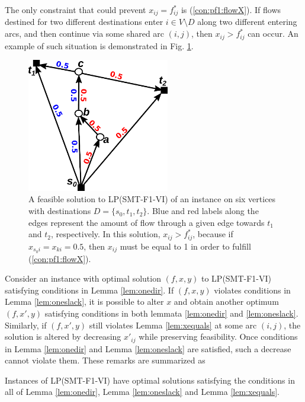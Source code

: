 The only constraint that could prevent $x_{ij}=f^*_{ij}$ is (\ref{con:pf1:flowX}). If flows destined for two different destinations enter $i\in V\setminus D$ along two different entering arcs, and then continue via some shared arc $(i,j)$, then $x_{ij}>f^*_{ij}$ can occur. An example of such situation is demonstrated in Fig. \ref{fig:counterex}.
\begin{figure}[h!]
        \centering
        \includegraphics[height=2.3in]{counterex}
        \caption{A feasible solution to LP(SMT-F1-VI) of an instance on six vertices with destinations $D=\{s_0,t_1,t_2\}$. Blue and red labels along the edges represent the amount of flow through a given edge towards $t_1$ and $t_2$, respectively. In this solution, $x_{ij}>f^*_{ij}$, because if $x_{s_0i}=x_{ki}=0.5$, then $x_{ij}$ must be equal to 1 in order to fulfill (\ref{con:pf1:flowX}).}
                \label{fig:counterex}
\end{figure}
 
Consider an instance with optimal solution $(f,x,y)$ to LP(SMT-F1-VI) satisfying conditions in Lemma \ref{lem:onedir}. If $(f,x,y)$ violates conditions in Lemma \ref{lem:oneslack}, it is possible to alter $x$ and obtain another optimum $(f,x',y)$ satisfying conditions in both lemmata \ref{lem:onedir} and \ref{lem:oneslack}. Similarly, if $(f,x',y)$ still violates Lemma \ref{lem:xequals} at some arc $(i,j)$, the solution is altered by decreasing $x'_{ij}$ while preserving feasibility. Once conditions in Lemma \ref{lem:onedir} and Lemma \ref{lem:oneslack} are satisfied, such a decrease cannot violate them. These remarks are summarized as 
\begin{obs}
Instances of LP(SMT-F1-VI) have optimal solutions satisfying the conditions in all of Lemma \ref{lem:onedir}, Lemma \ref{lem:oneslack} and Lemma \ref{lem:xequals}.
\end{obs}



